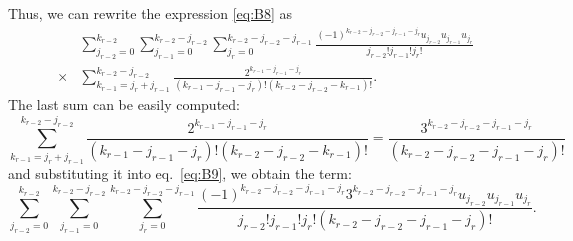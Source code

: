 \documentclass[10pt]{amsart}
\numberwithin{equation}{section}
\theoremstyle{definition}
\begin{document}
Thus, we can rewrite the expression  \eqref{eq:B8} as
\begin{eqnarray}
\label{eq:B9}
&&\sum _{j_{r-2}=0}^{k_{r-2}} \sum _{j_{r-1}=0}^{k_{r-2}-j_{r-2}}
\sum _{j_{r}=0}^{k_{r-2}-j_{r-2}-j_{r-1}}
\frac{(-1)^{k_{r-2}-j_{r-2}-j_{r-1}-j_{r}}u_{j_{r-2}}u_{j_{r-1}}u_{j_{r}}}{j_{r-2}!j_{r-1}!j_{r}!}
\\
&\times & \sum _{k_{r-1}=j_{r}+j_{r-1}}^{k_{r-2}-j_{r-2}}
\frac{2^{k_{r-1}-j_{r-1
}-j_{r}}}{( k_{r-1}-j_{r-1}-j_{r})!(k_{r-2}-j_{r-2}-k_{r-1})!}.
\nonumber
\end{eqnarray}
The last sum can be easily computed:
\begin{equation}
\sum _{k_{r-1}=j_{r}+j_{r-1}}^{k_{r-2}-j_{r-2}}
\frac{2^{k_{r-1}-j_{r-1
}-j_{r}}}{( k_{r-1}-j_{r-1}-j_{r})!(k_{r-2}-j_{r-2}-k_{r-1})!}=
\frac{3^{k_{r-2}-j_{r-2}-j_{r-1
}-j_{r}}}{(k_{r-2}-j_{r-2}-j_{r-1}-j_{r})!}
\label{eqC.10}
\end{equation}
and substituting it into  eq.~\eqref{eq:B9}, we obtain the term:
\begin{equation}
\label{term2}
\sum _{j_{r-2}=0}^{k_{r-2}} \sum _{j_{r-1}=0}^{k_{r-2}-j_{r-2}} \sum _{j_{r}=0}^{k_{r-2}-j_{r-2}-j_{r-1}}
\frac{(-1)^{k_{r-2}-j_{r-2}-j_{r-1}-j_{r}}3^{k_{r-2}-j_{r-2}-j_{r-1
}-j_{r}}u_{j_{r-2}}u_{j_{r-1}}u_{j_{r}}}{j_{r-2}!j_{r-1}!j_{r}!(k_{r-2}-j_{r-2}-j_{r-1}-j_{r})!}.
\end{equation}
\end{document}
